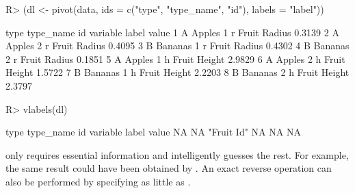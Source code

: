 \documentclass[nojss]{jss} %
\newcommand{\fct}[1]{\code{#1()}}
\begin{document}
\begin{Schunk}
\begin{Sinput}
R> (dl <- pivot(data, ids = c("type", "type_name", "id"), labels = "label"))
\end{Sinput}
\begin{Soutput}
  type type_name id variable        label  value
1    A    Apples  1        r Fruit Radius 0.3139
2    A    Apples  2        r Fruit Radius 0.4095
3    B   Bananas  1        r Fruit Radius 0.4302
4    B   Bananas  2        r Fruit Radius 0.1851
5    A    Apples  1        h Fruit Height 2.9829
6    A    Apples  2        h Fruit Height 1.5722
7    B   Bananas  1        h Fruit Height 2.2203
8    B   Bananas  2        h Fruit Height 2.3797
\end{Soutput}
\begin{Sinput}
R> vlabels(dl)
\end{Sinput}
\begin{Soutput}
      type  type_name         id   variable      label      value 
        NA         NA "Fruit Id"         NA         NA         NA 
\end{Soutput}
\end{Schunk}
%
\fct{pivot} only requires essential information and intelligently guesses the rest. For example, the same result could have been obtained by . An exact reverse operation can also be performed by specifying as little as . \newline
\end{document}
